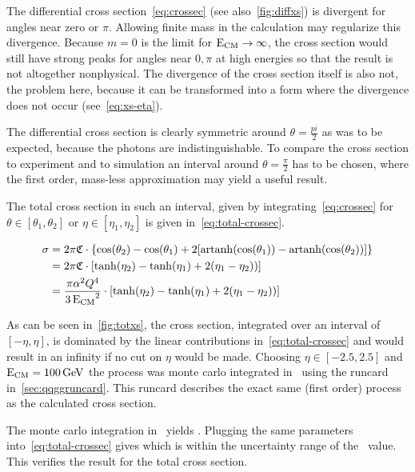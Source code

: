The differential cross section~\eqref{eq:crossec} (see
also~\ref{fig:diffxs}) is divergent for angles near zero or
\(\pi\). Allowing finite mass in the calculation may regularize this
divergence. Because \(m=0\) is the limit for
\(\operatorname{E_{\text{CM}}}\rightarrow\infty\), the cross section would still have strong
peaks for angles near \(0,\pi\) at high energies so that the result is
not altogether nonphysical. The divergence of the cross section itself
is also not, the problem here, because it can be transformed into a
form where the divergence does not occur (see~\eqref{eq:xs-eta}).

The differential cross section is clearly symmetric around
\(\theta=\frac{pi}{2}\) as was to be expected, because the photons are
indistinguishable. To compare the cross section to experiment and to
simulation an interval around \(\theta=\frac{\pi}{2}\) has to be
chosen, where the first order, mass-less approximation may yield a
useful result.

The total cross section in such an interval, given by
integrating~\eqref{eq:crossec} for \(\theta\in [\theta_1, \theta_2]\)
or \(\eta\in [\eta_1, \eta_2]\) is given
in~\eqref{eq:total-crossec}.

\begin{equation}
  \label{eq:total-crossec}
  \begin{split}
  \sigma &=
  2\pi\mathfrak{C}\cdot\qty{\cos(\theta_2)-\cos(\theta_1)+2\qty[\operatorname{artanh}(\cos(\theta_1))
    - \operatorname{artanh}(\cos(\theta_2))]} \\
  &=2\pi\mathfrak{C}\cdot\qty[\tanh(\eta_2) - \tanh(\eta_1) + 2(\eta_1
  - \eta_2))] \\
  &={\frac{\pi\alpha^2Q^4}{3\operatorname{E_{\text{CM}}}^2}}\cdot\qty[\tanh(\eta_2) - \tanh(\eta_1) + 2(\eta_1
  - \eta_2))]
  \end{split}
\end{equation}

As can be seen in~\ref{fig:totxs}, the cross section, integrated over
an interval of \([-\eta, \eta]\), is dominated by the linear
contributions in~\ref{eq:total-crossec} and would result in an
infinity if no cut on \(\eta\) would be made.  Choosing
\(\eta\in [-2.5,2.5]\) and \(\operatorname{E_{\text{CM}}}=\SI{100}{\giga\electronvolt}\) the
process was monte carlo integrated in \sherpa\ using the runcard
in~\ref{sec:qqggruncard}. This runcard describes the exact same (first
order) process as the calculated cross section.

The monte carlo integration in \sherpa\ yields
. Plugging the same parameters
into~\eqref{eq:total-crossec} gives  which is within the
uncertainty range of the \sherpa\ value. This verifies the result for
the total cross section.
